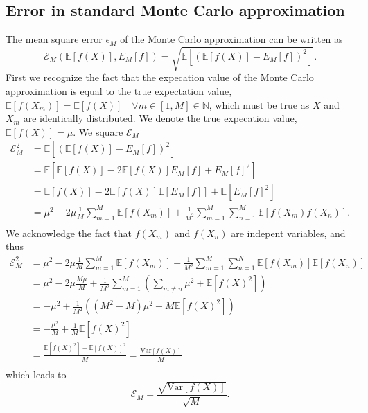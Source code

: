 \subsection{Error in standard Monte Carlo approximation}\label{app:MC_error}
The mean square error $\epsilon_M$ of the Monte Carlo approximation can be written as 
\begin{equation}
    \mathcal{E}_M(\mathbb{E}[f(X)],E_M[f]) = \sqrt{\mathbb{E}[(\mathbb{E}[f(X)]-E_M[f])^2]}. 
\end{equation}
First we recognize the fact that the expecation value of the Monte Carlo approximation is equal to the true expectation value,  $\mathbb{E}[f(X_m)]=\mathbb{E}[f(X)]\quad \forall m\in[1, M]\in\mathbb{N}$, which must be true as $X$ and $X_m$ are identically distributed. We denote the true expecation value, $\mathbb{E}[f(X)]=\mu$. 
We square $\mathcal{E}_M$ 
\begin{equation*}
    \begin{split}
        \mathcal{E}_M^2 &= \mathbb{E}[(\mathbb{E}[f(X)]-E_M[f])^2] \\
        &= \mathbb{E}[\mathbb{E}[f(X)]-2\mathbb{E}[f(X)]E_M[f]+E_M[f]^2] \\
        &= \mathbb{E}[f(X)]-2\mathbb{E}[f(X)]\mathbb{E}[E_M[f]]+\mathbb{E}[E_M[f]^2] \\
        &= \mu^2-2\mu\frac{1}{M}\sum_{m=1}^M\mathbb{E}[f(X_m)] + \frac{1}{M^2}\sum_{m=1}^M\sum_{n=1}^M\mathbb{E}[f(X_m)f(X_n)]. \\
    \end{split}
\end{equation*}
We acknowledge the fact that $f(X_m)$ and $f(X_n)$ are indepent variables, and thus
\begin{equation*}
    \begin{split}
        \mathcal{E}_M^2 &= \mu^2-2\mu\frac{1}{M}\sum_{m=1}^M\mathbb{E}[f(X_m)] + \frac{1}{M^2}\sum_{m=1}^M\sum_{n=1}^N\mathbb{E}[f(X_m)]\mathbb{E}[f(X_n)] \\
        &= \mu^2-2\mu\frac{M\mu}{M} + \frac{1}{M^2}\sum_{m=1}^M(\sum_{m\neq n}\mu^2 + \mathbb{E}[f(X)^2]) \\
        &= -\mu^2+\frac{1}{M^2}((M^2-M)\mu^2 + M\mathbb{E}[f(X)^2]) \\
        &= -\frac{\mu^2}{M} + \frac{1}{M}\mathbb{E}[f(X)^2] \\
        &= \frac{\mathbb{E}[f(X)^2]-\mathbb{E}[f(X)]^2}{M} = \frac{\text{Var}[f(X)]}{M} \\
    \end{split}
\end{equation*}
which leads to 
\begin{equation*}
    \mathcal{E}_M = \frac{\sqrt{\text{Var}[f(X)]}}{\sqrt{M}}.
\end{equation*}
